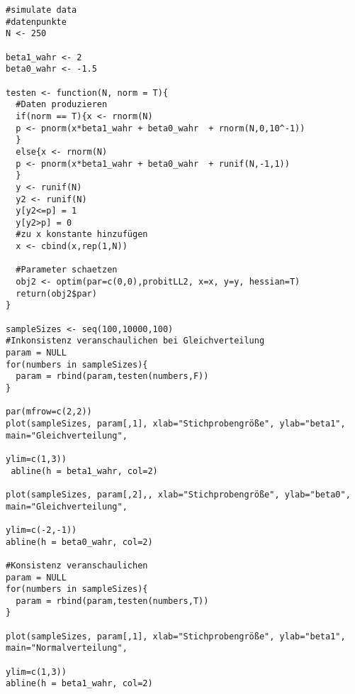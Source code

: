 \begin{Solution}{12.6}
\begin{verbatim}
#simulate data
#datenpunkte
N <- 250

beta1_wahr <- 2
beta0_wahr <- -1.5

testen <- function(N, norm = T){
  #Daten produzieren
  if(norm == T){x <- rnorm(N)
  p <- pnorm(x*beta1_wahr + beta0_wahr  + rnorm(N,0,10^-1))
  }
  else{x <- rnorm(N)
  p <- pnorm(x*beta1_wahr + beta0_wahr  + runif(N,-1,1))
  }
  y <- runif(N)
  y2 <- runif(N)
  y[y2<=p] = 1
  y[y2>p] = 0
  #zu x konstante hinzufügen
  x <- cbind(x,rep(1,N))

  #Parameter schaetzen
  obj2 <- optim(par=c(0,0),probitLL2, x=x, y=y, hessian=T)
  return(obj2$par)
}

sampleSizes <- seq(100,10000,100)
#Inkonsistenz veranschaulichen bei Gleichverteilung
param = NULL
for(numbers in sampleSizes){
  param = rbind(param,testen(numbers,F))
}

par(mfrow=c(2,2))
plot(sampleSizes, param[,1], xlab="Stichprobengröße", ylab="beta1", main="Gleichverteilung",
                                                                                ylim=c(1,3))
 abline(h = beta1_wahr, col=2)

plot(sampleSizes, param[,2],, xlab="Stichprobengröße", ylab="beta0", main="Gleichverteilung",
                                                                                ylim=c(-2,-1))
abline(h = beta0_wahr, col=2)

#Konsistenz veranschaulichen
param = NULL
for(numbers in sampleSizes){
  param = rbind(param,testen(numbers,T))
}

plot(sampleSizes, param[,1], xlab="Stichprobengröße", ylab="beta1", main="Normalverteilung",
                                                                                ylim=c(1,3))
abline(h = beta1_wahr, col=2)


\end{verbatim}
\end{Solution}
